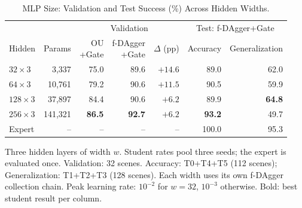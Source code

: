 \begin{table}[!htbp]
\caption{MLP Size: Validation and Test Success (\%) Across Hidden Widths.}
\label{tab:network-size}
\centering
\setlength{\tabcolsep}{2.5pt}
\begin{tabular}{@{}lrrrrrr@{}}
\toprule
 & & \multicolumn{3}{c}{Validation} & \multicolumn{2}{c}{Test: f-DAgger+Gate} \\
\cmidrule(lr){3-5}\cmidrule(l){6-7}
Hidden & Params & \shortstack{OU\\+Gate} & \shortstack{f-DAgger\\+Gate} & \shortstack{$\Delta$\\(pp)} & Accuracy & Generalization \\
\midrule
$32\times3$ & 3,337 & 75.0 & 89.6 & $+14.6$ & 89.0 & 62.0 \\
$64\times3$ & 10,761 & 79.2 & 90.6 & $+11.5$ & 90.5 & 59.9 \\
$128\times3$ & 37,897 & 84.4 & 90.6 & $+6.2$ & 89.9 & \textbf{64.8} \\
$256\times3$ & 141,321 & \textbf{86.5} & \textbf{92.7} & $+6.2$ & \textbf{93.2} & 49.7 \\
\midrule
Expert & -- & -- & -- & -- & 100.0 & 95.3 \\
\bottomrule
\end{tabular}
\par\smallskip
\begin{minipage}{\columnwidth}\footnotesize
Three hidden layers of width $w$. Student rates pool three seeds;
the expert is evaluated once. Validation: 32 scenes.
Accuracy: T0+T4+T5 (112 scenes); Generalization: T1+T2+T3 (128 scenes).
Each width uses its own f-DAgger collection chain.
Peak learning rate: $10^{-2}$ for $w=32$, $10^{-3}$ otherwise.
Bold: best student result per column.
\end{minipage}
\end{table}
